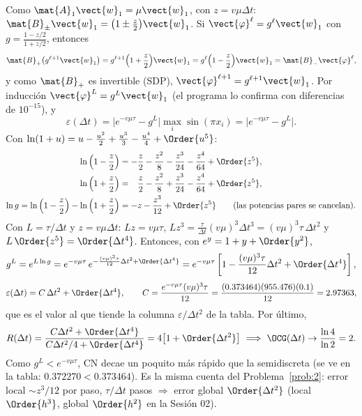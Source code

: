 Como $\mat{A}_1\vect{w}_1 = \mu\vect{w}_1$, con $z = v\mu\Delta t$:
$\mat{B}_\pm\vect{w}_1 = \big(1 \pm \tfrac{z}{2}\big)\vect{w}_1$. Si $\vect{\varphi}^\ell = g^\ell\vect{w}_1$ con
$g = \frac{1 - z/2}{1 + z/2}$, entonces
\[
  \mat{B}_+\big(g^{\ell+1}\vect{w}_1\big) = g^{\ell+1}\Big(1 + \frac z2\Big)\vect{w}_1 = g^\ell\Big(1 - \frac z2\Big)\vect{w}_1
  = \mat{B}_-\vect{\varphi}^\ell,
\]
y como $\mat{B}_+$ es invertible (SDP), $\vect{\varphi}^{\ell+1} = g^{\ell+1}\vect{w}_1$. Por inducción
$\vect{\varphi}^L = g^L\vect{w}_1$ (el programa lo confirma con diferencias de $10^{-15}$), y
\[
  \varepsilon(\Delta t) = \big|e^{-v\mu\tau} - g^L\big|\max_i\sin(\pi x_i) = \big|e^{-v\mu\tau} - g^L\big| .
\]
Con $\ln(1+u) = u - \frac{u^2}{2} + \frac{u^3}{3} - \frac{u^4}{4} + \Order{u^5}$:
\begin{align*}
  \ln\Big(1 - \frac z2\Big) &= -\frac z2 - \frac{z^2}{8} - \frac{z^3}{24} - \frac{z^4}{64} + \Order{z^5},\\
  \ln\Big(1 + \frac z2\Big) &= \phantom{-}\frac z2 - \frac{z^2}{8} + \frac{z^3}{24} - \frac{z^4}{64} + \Order{z^5},\\
  \ln g = \ln\Big(1 - \frac z2\Big) - \ln\Big(1 + \frac z2\Big) &= -z - \frac{z^3}{12} + \Order{z^5}
  \qquad (\text{las potencias pares se cancelan}).
\end{align*}
Con $L = \tau/\Delta t$ y $z = v\mu\Delta t$: $Lz = v\mu\tau$, $Lz^3 = \frac{\tau}{\Delta t}(v\mu)^3\Delta t^3 = (v\mu)^3\tau\,\Delta t^2$
y $L\,\Order{z^5} = \Order{\Delta t^4}$. Entonces, con $e^y = 1 + y + \Order{y^2}$,
\[
  g^L = e^{L\ln g} = e^{-v\mu\tau}\,e^{-\frac{(v\mu)^3\tau}{12}\Delta t^2 + \Order{\Delta t^4}}
  = e^{-v\mu\tau}\left[1 - \frac{(v\mu)^3\tau}{12}\Delta t^2 + \Order{\Delta t^4}\right],
\]
\[
  \varepsilon(\Delta t) = C\,\Delta t^2 + \Order{\Delta t^4}, \qquad
  C = \frac{e^{-v\mu\tau}(v\mu)^3\tau}{12} = \frac{(0.373464)(955.476)(0.1)}{12} = 2.97363,
\]
que es el valor al que tiende la columna $\varepsilon/\Delta t^2$ de la tabla. Por último,
\[
  R(\Delta t) = \frac{C\Delta t^2 + \Order{\Delta t^4}}{C\Delta t^2/4 + \Order{\Delta t^4}} = 4\big[1 + \Order{\Delta t^2}\big]
  \ \Longrightarrow\ \OCG(\Delta t)\to\frac{\ln 4}{\ln 2} = 2 .
\]
Como $g^L < e^{-v\mu\tau}$, CN decae un poquito más rápido que la semidiscreta (se ve en la tabla:
$0.372270 < 0.373464$). Es la misma cuenta del Problema~\ref{prob:2}: error local $\sim z^3/12$ por paso,
$\tau/\Delta t$ pasos $\Rightarrow$ error global $\Order{\Delta t^2}$ (local $\Order{h^3}$, global $\Order{h^2}$ en la Sesión 02).

